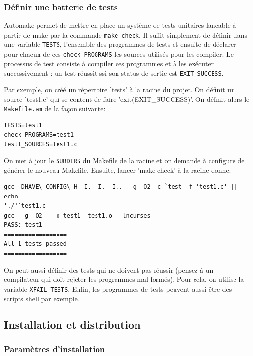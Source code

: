 \documentclass[11pt,a4paper]{article}
\begin{document}
\subsubsection{Définir une batterie de tests}

Automake permet de mettre en place un système de tests unitaires
lancable à partir de make par la commande \texttt{make check}. Il
suffit simplement de définir dans une variable \texttt{TESTS},
l'ensemble des programmes de tests et ensuite de déclarer pour chacun
de ces \texttt{check\_PROGRAMS} les sources utilisés pour les
compiler. Le processus de test consiste à compiler ces programmes et à
les exécuter successivement : un test réussit ssi son status de sortie
est \texttt{EXIT\_SUCCESS}.

Par exemple, on créé un répertoire 'tests' à la racine du projet. On
définit un source 'test1.c' qui se content de faire
'exit(EXIT\_SUCCESS)'. On définit alors le \texttt{Makefile.am} de la
façon suivante:

{\small
\begin{verbatim}
TESTS=test1
check_PROGRAMS=test1
test1_SOURCES=test1.c
\end{verbatim}
}

On met à jour le \texttt{SUBDIRS} du Makefile de la racine et on
demande à configure de générer le nouveau Makefile. Ensuite, lancer
'make check' à la racine donne:

{\small
\begin{verbatim}
gcc -DHAVE\_CONFIG\_H -I. -I. -I..  -g -O2 -c `test -f 'test1.c' || echo
'./'`test1.c
gcc  -g -O2   -o test1  test1.o  -lncurses
PASS: test1
==================
All 1 tests passed
==================
\end{verbatim}
}

On peut aussi définir des tests qui ne doivent pas réussir (pensez à
un compilateur qui doit rejeter les programmes mal formés). Pour cela,
on utilise la variable \texttt{XFAIL\_TESTS}. Enfin, les programmes de tests
peuvent aussi être des scripts shell par exemple.

\subsection{Installation et distribution}

\subsubsection{Paramètres d'installation}
\end{document}
